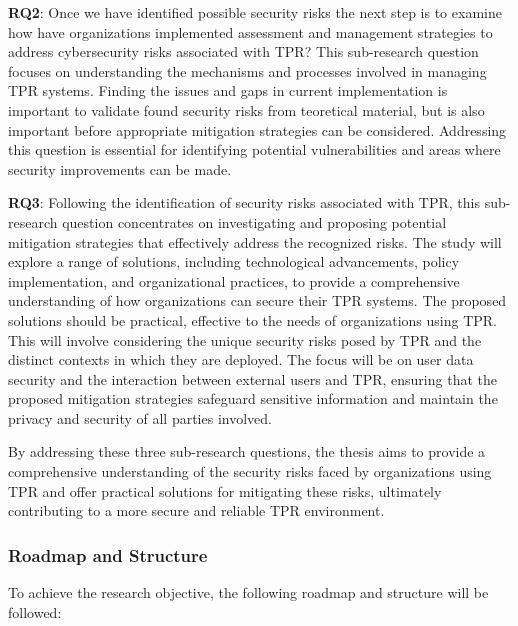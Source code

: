 \textbf{RQ2}: Once we have identified possible security risks the next step is to examine how have organizations implemented assessment
and management strategies to address cybersecurity risks associated with \ac{TPR}? This sub-research question focuses on understanding
the mechanisms and processes involved in managing \ac{TPR} systems. Finding the issues and gaps in current implementation is important to validate found security risks from teoretical material, but is also important before appropriate mitigation strategies can be considered. Addressing this question is essential for identifying potential vulnerabilities and areas where security improvements can be made.

\textbf{RQ3}: Following the identification of security risks associated with \ac{TPR}, this sub-research question concentrates on investigating and proposing potential mitigation strategies that effectively address the recognized risks. The study will explore a range of solutions, including technological advancements, policy implementation, and organizational practices, to provide a comprehensive understanding of how organizations can secure their \ac{TPR} systems. The proposed solutions should be practical, effective to the needs of organizations using \ac{TPR}.
  This will involve considering the unique security risks posed by \ac{TPR} and the distinct contexts in which they are deployed.
  The focus will be on user data security and the interaction between external users and \ac{TPR}, ensuring that the proposed mitigation strategies safeguard sensitive information and maintain the privacy and security of all parties involved.


By addressing these three sub-research questions, the thesis aims to provide a comprehensive understanding of the security risks faced by
organizations using \ac{TPR} and offer practical solutions for mitigating these risks, ultimately contributing to a more secure and
reliable \ac{TPR} environment.

\subsubsection{Roadmap and Structure}

To achieve the research objective, the following roadmap and structure will be followed:

